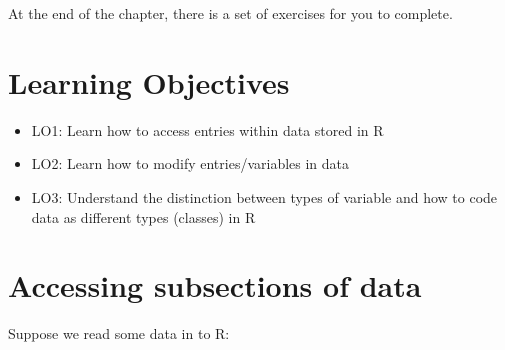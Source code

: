 \documentclass[]{book}
\newenvironment{Shaded}{\begin{snugshade}}{\end{snugshade}}
\newcommand{\DecValTok}[1]{\textcolor[rgb]{0.00,0.00,0.81}{#1}}
\newcommand{\KeywordTok}[1]{\textcolor[rgb]{0.13,0.29,0.53}{\textbf{#1}}}
\newcommand{\NormalTok}[1]{#1}
\newcommand{\OperatorTok}[1]{\textcolor[rgb]{0.81,0.36,0.00}{\textbf{#1}}}
\newcommand{\OtherTok}[1]{\textcolor[rgb]{0.56,0.35,0.01}{#1}}
\newcommand{\StringTok}[1]{\textcolor[rgb]{0.31,0.60,0.02}{#1}}
\providecommand{\tightlist}{%
  \setlength{\itemsep}{0pt}\setlength{\parskip}{0pt}}
\begin{document}
At the end of the chapter, there is a set of exercises for you to complete.

\hypertarget{learning-objectives-1}{%
\section*{Learning Objectives}\label{learning-objectives-1}}

\begin{itemize}
\tightlist
\item
  LO1: Learn how to access entries within data stored in R\\
\item
  LO2: Learn how to modify entries/variables in data\\
\item
  LO3: Understand the distinction between types of variable and how to code data as different types (classes) in R
\end{itemize}

\hypertarget{accessing-subsections-of-data}{%
\section{Accessing subsections of data}\label{accessing-subsections-of-data}}

Suppose we read some data in to R:

\begin{Shaded}
\end{Shaded}
\end{document}
